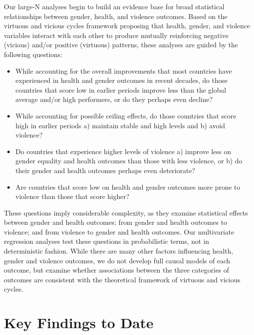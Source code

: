 \documentclass[12pt]{article}
\begin{document}
Our large-N analyses begin to build an evidence base for broad statistical relationships between gender, health, and violence outcomes.
Based on the virtuous and vicious cycles framework proposing that health, gender, and violence variables interact with each other to produce mutually reinforcing negative (vicious) and/or positive (virtuous) patterns, these analyses are guided by the following questions:
\begin{itemize}
\item While accounting for the overall improvements that most countries have experienced in health and gender outcomes in recent decades, do those countries that score low in earlier periods improve less than the global average and/or high performers, or do they perhaps even decline?
\item While accounting for possible ceiling effects, do those countries that score high in earlier periods a) maintain stable and high levels and b) avoid violence?
\item Do countries that experience higher levels of violence a) improve less on gender equality and health outcomes than those with less violence, or b) do their gender and health outcomes perhaps even deteriorate?
\item Are countries that score low on health and gender outcomes more prone to violence than those that score higher?
\end{itemize}

These questions imply considerable complexity, as they examine statistical effects between gender and health outcomes; from gender and health outcomes to violence; and from violence to gender and health outcomes.
Our multivariate regression analyses test these questions in probabilistic terms, not in deterministic fashion.
While there are many other factors influencing health, gender and violence outcomes, we do not develop full causal models of each outcome, but examine whether associations between the three categories of outcomes are consistent with the theoretical framework of virtuous and vicious cycles.

\section{Key Findings to Date}
\end{document}
